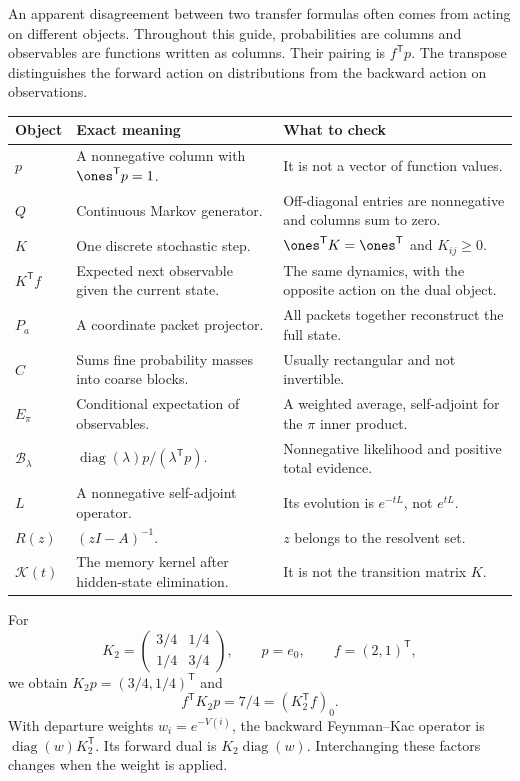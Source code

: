 An apparent disagreement between two transfer formulas often comes from acting on different objects. Throughout this guide, probabilities are columns and observables are functions written as columns. Their pairing is $f^{\mathsf T}p$. The transpose distinguishes the forward action on distributions from the backward action on observations.
\begin{center}\small
\begin{tabularx}{\linewidth}{@{}lYY@{}}\toprule
Object & Exact meaning & What to check\\\midrule
$p$ & A nonnegative column with $\ones^{\mathsf T}p=1$. & It is not a vector of function values.\\
$Q$ & Continuous Markov generator. & Off-diagonal entries are nonnegative and columns sum to zero.\\
$K$ & One discrete stochastic step. & $\ones^{\mathsf T}K=\ones^{\mathsf T}$ and $K_{ij}\ge0$.\\
$K^{\mathsf T}f$ & Expected next observable given the current state. & The same dynamics, with the opposite action on the dual object.\\
$P_a$ & A coordinate packet projector. & All packets together reconstruct the full state.\\
$C$ & Sums fine probability masses into coarse blocks. & Usually rectangular and not invertible.\\
$E_\pi$ & Conditional expectation of observables. & A weighted average, self-adjoint for the $\pi$ inner product.\\
$\mathcal B_\lambda$ & $\operatorname{diag}(\lambda)p/(\lambda^{\mathsf T}p)$. & Nonnegative likelihood and positive total evidence.\\
$L$ & A nonnegative self-adjoint operator. & Its evolution is $e^{-tL}$, not $e^{tL}$.\\
$R(z)$ & $(zI-A)^{-1}$. & $z$ belongs to the resolvent set.\\
$\mathcal K(t)$ & The memory kernel after hidden-state elimination. & It is not the transition matrix $K$.\\\bottomrule
\end{tabularx}\end{center}
For
\[
K_2=\begin{pmatrix}3/4&1/4\\1/4&3/4\end{pmatrix},
\qquad p=e_0,\qquad f=(2,1)^{\mathsf T},
\]
we obtain $K_2p=(3/4,1/4)^{\mathsf T}$ and
\[
f^{\mathsf T}K_2p=7/4=(K_2^{\mathsf T}f)_0.
\]
With departure weights $w_i=e^{-V(i)}$, the backward Feynman--Kac operator is $\operatorname{diag}(w)K_2^{\mathsf T}$. Its forward dual is $K_2\operatorname{diag}(w)$. Interchanging these factors changes when the weight is applied.

